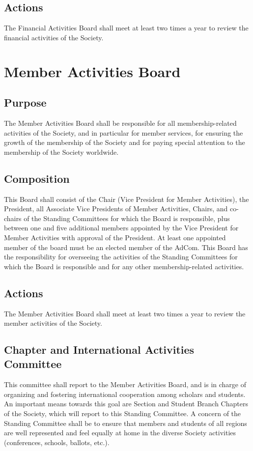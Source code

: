 \documentclass[10pt]{article}
\begin{document}
\subsection{Actions}
The Financial Activities Board shall meet at least two times a year to review the financial activities of the Society. 


\section{Member Activities Board}
\label{MAB}
\subsection{Purpose}
The Member Activities Board shall be responsible for all membership-related activities of the Society, and in particular for member services, for ensuring the growth of the membership of the Society and for paying special attention to the membership of the Society worldwide.

\subsection{Composition}
This Board shall consist of the Chair (Vice President for Member Activities), the President, all Associate Vice Presidents of Member Activities, Chairs, and co-chairs of the Standing Committees for which the Board is responsible, plus between one and five additional members appointed by the Vice President for Member Activities with approval of the President. At least one appointed member of the board must be an elected member of the AdCom. This Board has the responsibility for overseeing the activities of the Standing Committees for which the Board is responsible and for any other membership-related activities.


\subsection{Actions}
The Member Activities Board shall meet at least two times a year to review the member activities of the Society.


\subsection{Chapter and International Activities Committee}

This committee shall report to the Member Activities Board, and is in charge of organizing and fostering international cooperation among scholars and students. An important means towards this goal are Section and Student Branch Chapters of the Society, which will report to this Standing Committee.  A concern of the Standing Committee shall be to ensure that members and students of all regions are well represented and feel equally at home in the diverse Society activities (conferences, schools, ballots, etc.).
\end{document}
